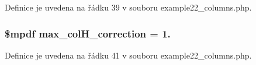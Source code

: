 Definice je uvedena na řádku 39 v souboru example22\-\_\-columns.\-php.

\hypertarget{example22__columns_8php_a82223bf6251d986c6d55546c14efc374}{
\subsubsection[{max\-\_\-col\-H\-\_\-correction}]{\setlength{\rightskip}{0pt plus 5cm}\$mpdf max\-\_\-col\-H\-\_\-correction = 1.}}\label{example22__columns_8php_a82223bf6251d986c6d55546c14efc374}


Definice je uvedena na řádku 41 v souboru example22\-\_\-columns.\-php.

